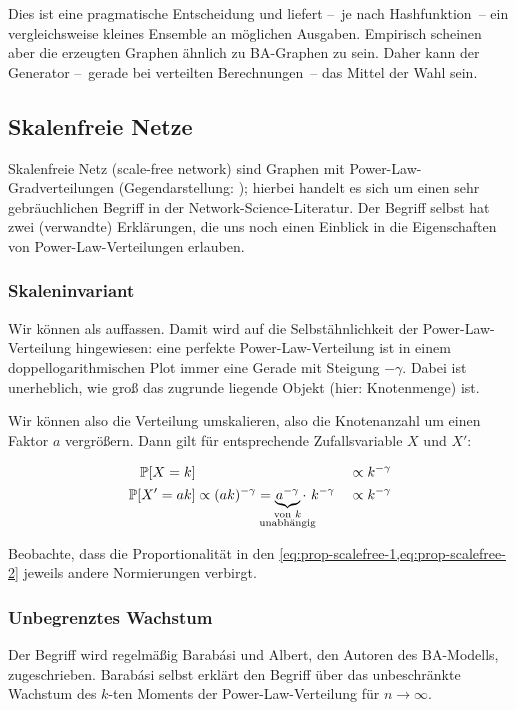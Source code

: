 Dies ist eine pragmatische Entscheidung und liefert --~je nach Hashfunktion~-- ein vergleichsweise kleines Ensemble an möglichen Ausgaben.
Empirisch scheinen aber die erzeugten Graphen ähnlich zu BA-Graphen zu sein.
Daher kann der Generator --~gerade bei verteilten Berechnungen~-- das Mittel der Wahl sein.

\subsection{Skalenfreie Netze}
Skalenfreie Netz (scale-free network) sind Graphen mit Power-Law-Gradverteilungen (Gegendarstellung: \cite{doi:10.1073/pnas.200327197});
hierbei handelt es sich um einen sehr gebräuchlichen Begriff in der Network-Science-Literatur.
Der Begriff selbst hat zwei (verwandte) Erklärungen, die uns noch einen Einblick in die Eigenschaften von Power-Law-Verteilungen erlauben.

\subsubsection{Skaleninvariant}\label{subsec:scaleinvariant}
Wir können  als  auffassen.
Damit wird auf die Selbstähnlichkeit der Power-Law-Verteilung hingewiesen:
eine perfekte Power-Law-Verteilung ist in einem doppellogarithmischen Plot immer eine Gerade mit Steigung $-\gamma$.
Dabei ist unerheblich, wie groß das zugrunde liegende Objekt (hier: Knotenmenge) ist.

Wir können also die Verteilung umskalieren, also \zB die Knotenanzahl um einen Faktor $a$ vergrößern.
Dann gilt für entsprechende Zufallsvariable $X$ und $X'$:

\begin{alignat}{2}
    \prob{X = k}   &                                                                                                                                  && \propto k^{-\gamma}  \label{eq:prop-scalefree-1} \\
    \prob{X' = ak} & \propto (ak)^{-\gamma} = \underbrace{a^{-\gamma}}_{\mathclap{\substack{\text{von $k$} \\ \text{unabhängig}}}} \cdot\ k^{-\gamma} && \propto k^{-\gamma}\label{eq:prop-scalefree-2}
\end{alignat}

Beobachte, dass die Proportionalität in den \cref{eq:prop-scalefree-1,eq:prop-scalefree-2} jeweils andere Normierungen verbirgt.

\subsubsection{Unbegrenztes Wachstum}
Der Begriff  wird regelmäßig Barab{\'{a}}si und Albert, den Autoren des BA-Modells, zugeschrieben.
Barab{\'{a}}si selbst erklärt den Begriff über das unbeschränkte Wachstum des $k$-ten Moments der Power-Law-Verteilung für $n \to \infty$.

